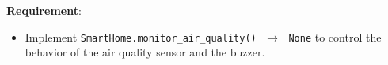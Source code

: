 \noindent\textbf{Requirement}:
\begin{itemize}
    \item Implement \texttt{SmartHome.monitor\_air\_quality() $\,\to\,$ None} to control the behavior of the air quality sensor and the buzzer.
\end{itemize}